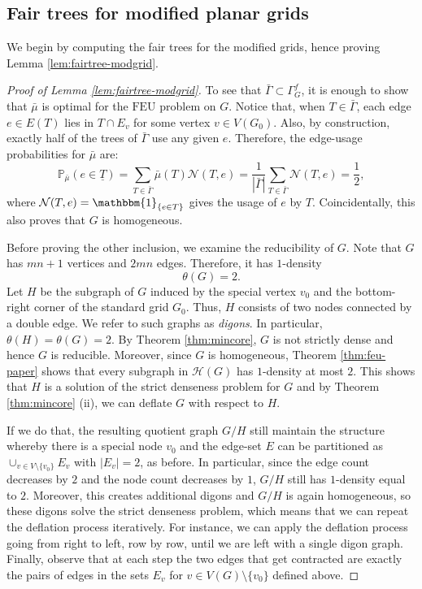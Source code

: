 \documentclass[preprint,12pt]{elsarticle}
\theoremstyle{definition}
\theoremstyle{remark}
\numberwithin{equation}{section}
\newcommand{\cH}{\mathcal{H}}
\newcommand{\bP}{\mathbb{P}}
\newcommand{\Ga}{\Gamma }
\begin{document}
\subsection{Fair trees for modified planar grids}\label{sec:modgrids}
We begin by computing the fair trees for the modified grids, hence proving Lemma  \ref{lem:fairtree-modgrid}.
\begin{proof}[Proof of Lemma \ref{lem:fairtree-modgrid}]
To see that $\bar{\Gamma}\subset\Gamma^f_G$, it is enough to show that $\bar{\mu}$ is optimal for  the $\text{FEU}$ problem on $G$. Notice that, when $T\in\bar{\Ga}$,  each edge $e \in E(T)$ lies in  $T \cap E_v$ for some vertex $v\in V(G_0).$ Also, by construction, exactly half of the trees of $ \bar{\Gamma}$  use any given $e$. Therefore, the edge-usage probabilities for $\bar{\mu}$ are:
 \begin{equation*}
 \bP_{\bar{\mu}}(e \in \underline{T})= \sum_{T \in \bar{\Gamma}} \bar{\mu}(T) \mathcal{N}(T,e)=\frac{1}{|\bar{\Gamma}|}\sum_{T \in \bar{ \Gamma}} \mathcal{N}(T,e)=\frac{1}{2},
 \end{equation*}
 where $\mathcal{N}(T,e)=\mathbbm{1}_{\{e \in T\}}$ gives the usage of $e$ by $T$.
 Coincidentally, this also proves that $G$ is homogeneous. 
  
Before proving the other inclusion, we examine the reducibility of $G$. 
Note that $G$ has $mn+1$ vertices and $2mn$ edges. Therefore, it has $1$-density
\begin{equation}\label{eq:modgrid-denseness}
\theta(G)=2.
\end{equation}  
Let $H$ be the subgraph of $G$ induced by the special vertex $v_0$ and the bottom-right corner of the standard grid $G_0$. Thus, $H$ consists of two nodes connected by a double edge. We refer to such graphs as {\it digons}. In particular, $\theta(H)=\theta(G)=2$. By Theorem \ref{thm:mincore}, $G$ is not strictly dense and hence $G$ is reducible. Moreover, since $G$ is homogeneous,  Theorem \ref{thm:feu-paper} shows that every subgraph in $\cH(G)$ has $1$-density at most $2$. This shows that $H$ is a solution of the strict denseness problem for $G$ and by Theorem \ref{thm:mincore} (ii), we can deflate $G$ with respect to $H$.

If we do that, the resulting quotient graph $G/H$ still maintain the structure whereby there is a special node $v_0$ and the edge-set $E$ can be partitioned as $\cup_{v\in V\setminus\{v_0\}}E_v$ with $|E_v|=2$, as before. In particular, since the edge count decreases by $2$ and the node count decreases by $1$, $G/H$ still has $1$-density equal to $2$. Moreover, this creates additional digons and $G/H$ is again homogeneous, so these digons solve the strict denseness problem, which means that we can repeat the deflation process iteratively.  For instance, we can apply the deflation process going from right to left, row by row, until we are left with a single digon graph. Finally, observe that at each step the two edges that get contracted are exactly the pairs of edges in the sets $E_v$ for $v\in V(G)\setminus\{v_0\}$ defined above. 


\end{proof}
\end{document}
